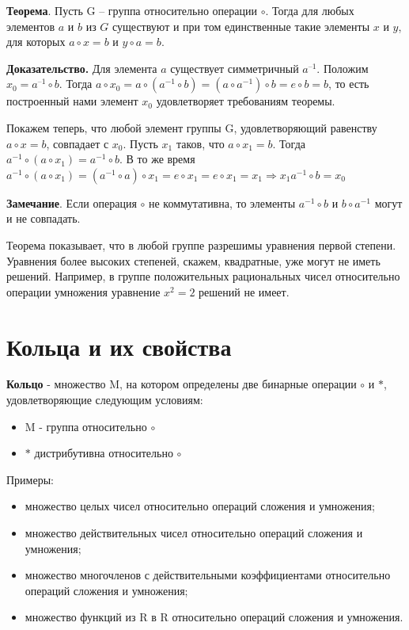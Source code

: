 \documentclass[a4paper]{article}
\begin{document}
{\begin{small}
\textbf{Теорема}. Пусть G – группа относительно операции $\circ$. Тогда для любых
элементов $a$ и $b$ из $G$ существуют и при том единственные такие элементы $x$ и $y$,
для которых $a 
\circ x = b$ и $y \circ a = b.$

\textbf{Доказательство.}  Для элемента $a$ существует симметричный $a^{–1}$. Положим
$x_0 = a^{–1} \circ b.$ Тогда
$a \circ x_0 = a \circ (a^{-1} \circ b) = (a \circ a^{-1} ) \circ b = e \circ b = b$, то есть построенный нами элемент $x_0$ удовлетворяет требованиям теоремы.

Покажем теперь, что любой элемент группы G, удовлетворяющий равенству $a \circ x = b$, совпадает с $x_0$. Пусть $x_1$ таков, что $a \circ x_1 = b$. Тогда $a^{-1} \circ (a \circ x_1) = a^{-1} \circ b$. В то же время $a^{-1} \circ (a \circ x_1) = (a^{-1} \circ a) \circ x_1 = e \circ x_1 = e \circ x_1 = x_1 \Rightarrow x_1  a^{-1} \circ b = x_0$

\textbf{Замечание}. Если операция $\circ$  не коммутативна, то элементы $a^{-1} \circ b$ и $b \circ a^{-1}$ могут и не совпадать.


Теорема показывает, что в любой группе разрешимы уравнения первой
степени. Уравнения более высоких степеней, скажем, квадратные, уже могут не
иметь решений. Например, в группе положительных рациональных чисел
относительно операции умножения уравнение $x^2 = 2$ решений не имеет.



\section*{Кольца и их свойства}
\textbf{Кольцо} - множество M, на котором определены две бинарные операции $\circ$ и $*$, удовлетворяющие следующим условиям:
\begin{itemize}
\item M - группа относительно $\circ$
\item $*$ дистрибутивна относительно $\circ$
\end{itemize}

Примеры:
\begin{itemize}
\item множество целых чисел относительно операций сложения и умножения;
\item множество действительных чисел относительно операций сложения и
умножения;
\item множество многочленов с действительными коэффициентами
относительно операций сложения и умножения;
\item множество функций из R в R относительно операций сложения и умножения.
\end{itemize}


\end{small}}
\end{document}
